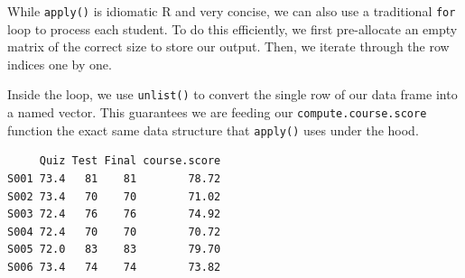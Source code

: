 \documentclass[
  letterpaper,
  DIV=11,
  numbers=noendperiod]{scrreprt}
\newenvironment{Shaded}{\begin{snugshade}}{\end{snugshade}}
\newcommand{\AttributeTok}[1]{\textcolor[rgb]{0.40,0.45,0.13}{#1}}
\newcommand{\CommentTok}[1]{\textcolor[rgb]{0.37,0.37,0.37}{#1}}
\newcommand{\ConstantTok}[1]{\textcolor[rgb]{0.56,0.35,0.01}{#1}}
\newcommand{\ControlFlowTok}[1]{\textcolor[rgb]{0.00,0.23,0.31}{\textbf{#1}}}
\newcommand{\DecValTok}[1]{\textcolor[rgb]{0.68,0.00,0.00}{#1}}
\newcommand{\FunctionTok}[1]{\textcolor[rgb]{0.28,0.35,0.67}{#1}}
\newcommand{\NormalTok}[1]{\textcolor[rgb]{0.00,0.23,0.31}{#1}}
\newcommand{\OtherTok}[1]{\textcolor[rgb]{0.00,0.23,0.31}{#1}}
\newcommand{\SpecialCharTok}[1]{\textcolor[rgb]{0.37,0.37,0.37}{#1}}
\newcommand{\StringTok}[1]{\textcolor[rgb]{0.13,0.47,0.30}{#1}}
\begin{document}
While \texttt{apply()} is idiomatic R and very concise, we can also use
a traditional \texttt{for} loop to process each student. To do this
efficiently, we first pre-allocate an empty matrix of the correct size
to store our output. Then, we iterate through the row indices one by
one.

Inside the loop, we use \texttt{unlist()} to convert the single row of
our data frame into a named vector. This guarantees we are feeding our
\texttt{compute.course.score} function the exact same data structure
that \texttt{apply()} uses under the hood.

\begin{Shaded}
\end{Shaded}

\begin{verbatim}
     Quiz Test Final course.score
S001 73.4   81    81        78.72
S002 73.4   70    70        71.02
S003 72.4   76    76        74.92
S004 72.4   70    70        70.72
S005 72.0   83    83        79.70
S006 73.4   74    74        73.82
\end{verbatim}
\end{document}
